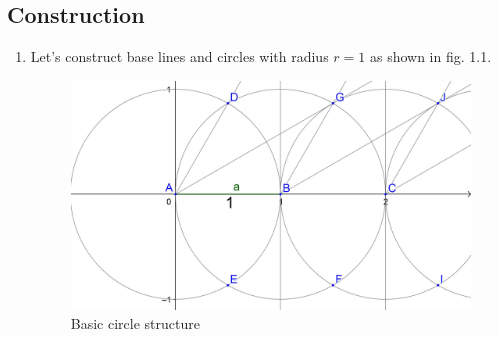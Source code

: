 \documentclass[12pt, letterpaper, oneside]{report}
\begin{document}
\tableofcontents

\chapter{}

\section{Construction}
\begin{enumerate}
	\item Let's construct base lines and circles with radius $r=1$ as shown in fig. 1.1.
\begin{figure}[H]
	\centerline{\includegraphics[scale=0.18]{img/basic.jpg}}
	\caption{Basic circle structure}
	\label{fig:basic}
\end{figure}
	

\end{enumerate}
\end{document}
